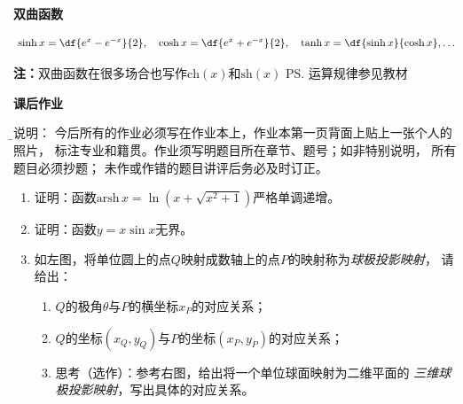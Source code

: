 {\bf 双曲函数}

$$\sinh x =\df{e^x-e^{-x}}{2}, \quad
\cosh x =\df{e^x+e^{-x}}{2}, \quad\tanh x=\df{\sinh
x}{\cosh x}, \ldots$$

{\bf 注：}双曲函数在很多场合也写作$\mathrm{ch}(x)$和$\mathrm{sh}(x)$
\ps{运算规律参见教材}

\bigskip

\begin{ext}
	{\centering\bf 课后作业}
	
	{\b\kaishu 说明：	今后所有的作业必须写在作业本上，作业本第一页背面上贴上一张个人的照片，
	标注专业和籍贯。作业须写明题目所在章节、题号；如非特别说明，	所有题目必须抄题；
	未作或作错的题目讲评后务必及时订正。}
	
	\begin{enumerate}  
	  \item 证明：函数$\mathrm{arsh}\,x=\ln(x+\sqrt{x^2+1})$严格单调递增。
	  \item 证明：函数$y=x\sin x$无界。
	  \item 如左图，将单位圆上的点$Q$映射成数轴上的点$P$的映射称为{\it 球极投影映射}，
	  请给出：
	  \begin{enumerate}[(1)]
	    \item $Q$的极角$\theta$与$P$的横坐标$x_P$的对应关系；
	    \item $Q$的坐标$(x_Q,y_Q)$与$P$的坐标$(x_P,y_P)$的对应关系；
	    \item 思考（选作）：参考右图，给出将一个单位球面映射为二维平面的
	    {\it 三维球极投影映射}，写出具体的对应关系。
	  \end{enumerate}
	\begin{center}
		\quad

\end{center}
\end{enumerate}
\end{ext}
